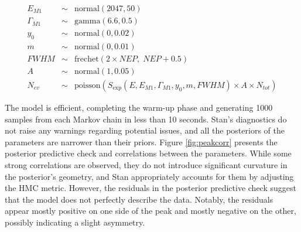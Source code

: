 \begin{eqnarray}
  E_{M 1} &\sim& \text{normal}(2047, 50)\\
  \Gamma_{M 1} &\sim& \text{gamma}(6.6, 0.5)\\
  y_0 &\sim& \text{normal}(0,0.02)\\
  m &\sim& \text{normal}(0,0.01)\\
  FWHM &\sim& \text{frechet}(2\times NEP, \;NEP+0.5)\\
  A&\sim& \text{normal}(1, 0.05)\\
  N_{ev}&\sim& \text{poisson}(S_{\exp}(E, E_{M 1}, \Gamma_{M 1}, y_0, m, FWHM)\times A\times N_{tot})
\end{eqnarray}





The model is efficient, completing the warm-up phase and generating 1000 samples from each Markov chain in less than 10
seconds. Stan's diagnostics do not raise any warnings regarding potential issues, and all the posteriors of the
parameters are narrower than their priors. Figure \ref{fig:peakcorr} presents the
posterior predictive check and correlations between the parameters. While some strong correlations are observed, they do
not introduce significant curvature in the posterior's geometry, and Stan appropriately accounts for them by adjusting
the HMC metric. However, the residuals in the posterior predictive check suggest that the model does not perfectly describe the data. Notably, the residuals appear mostly positive on one side of the peak and mostly negative on the other, possibly indicating a slight asymmetry.

